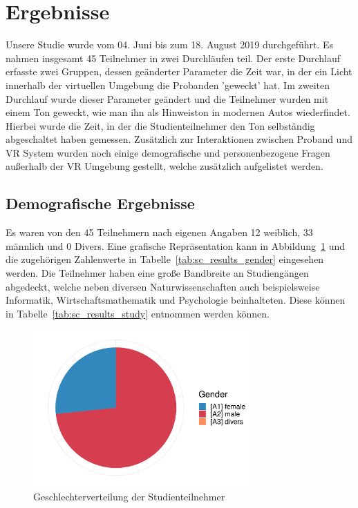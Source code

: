 \section{Ergebnisse}

Unsere Studie wurde vom 04. Juni bis zum 18. August 2019 durchgeführt. Es nahmen insgesamt 45 Teilnehmer in zwei Durchläufen teil. Der erste Durchlauf erfasste zwei Gruppen, dessen geänderter Parameter die Zeit war, in der ein Licht innerhalb der virtuellen Umgebung die Probanden 'geweckt' hat. Im zweiten Durchlauf wurde dieser Parameter geändert und die Teilnehmer wurden mit einem Ton geweckt, wie man ihn als Hinweiston in modernen Autos wiederfindet. Hierbei wurde die Zeit, in der die Studienteilnehmer den Ton selbständig abgeschaltet haben gemessen. Zusätzlich zur Interaktionen zwischen Proband und VR System wurden noch einige demografische und personenbezogene Fragen außerhalb der VR Umgebung gestellt, welche zusätzlich aufgelistet werden.

\subsection{Demografische Ergebnisse}

Es waren von den 45 Teilnehmern nach eigenen Angaben 12 weiblich, 33 männlich und 0 Divers. Eine grafische Repräsentation kann in Abbildung~\ref{fig:gender} und die zugehörigen Zahlenwerte in Tabelle~\ref{tab:sc_results_gender} eingesehen werden. Die Teilnehmer haben eine große Bandbreite an Studiengängen abgedeckt, welche neben diversen Naturwissenschaften auch beispielsweise Informatik, Wirtschaftsmathematik und Psychologie beinhalteten. Diese können in Tabelle~\ref{tab:sc_results_study} entnommen werden können.

\begin{figure}[H]
	\centering
	\includegraphics[width=0.75\textwidth]{./_StudyResults/gender}
	\caption{Geschlechterverteilung der Studienteilnehmer}
	\label{fig:gender}
\end{figure}

